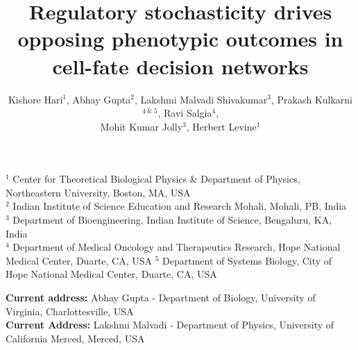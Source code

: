 \documentclass[11pt]{article}
\title{Regulatory stochasticity drives opposing phenotypic outcomes in cell-fate decision networks}
\author{Kishore Hari$^1$, Abhay Gupta$^2$, Lakshmi Malvadi Shivakumar$^3$, Prakash Kulkarni$^{4~\&~5}$, Ravi Salgia$^4$, \\ Mohit Kumar Jolly$^3$, Herbert Levine$^1$}
\providecommand{\DIFaddtex}[1]{{\protect\color{blue}\uwave{#1}}} %
\providecommand{\DIFaddbegin}{} %
\providecommand{\DIFaddend}{} %
\providecommand{\DIFadd}[1]{\texorpdfstring{\DIFaddtex{#1}}{#1}} %
\providecommand{\DIFaddincludegraphics}[2][]{{\color{blue}\fbox{\DIFOincludegraphics[#1]{#2}}}} %
\DeclareRobustCommand{\DIFaddbegin}{\DIFOaddbegin \let\includegraphics\DIFaddincludegraphics} %
\DeclareRobustCommand{\DIFaddend}{\DIFOaddend \let\includegraphics\DIFOincludegraphics} %
\begin{document}
\maketitle
\begin{center}
    $^1$ Center for Theoretical Biological Physics \& Department of Physics, Northeastern University, Boston, MA, USA\\
    $^2$ Indian Institute of Science Education and Research Mohali, Mohali, PB, India\\
    $^3$ Department of Bioengineering, Indian Institute of Science, Bengaluru, KA, India \\
    $^4$ Department of Medical Oncology and Therapeutics Research, \DIFaddbegin \DIFadd{City of }\DIFaddend Hope National Medical Center, Duarte, CA, USA
    $^5$ Department of Systems Biology, City of Hope National Medical Center, Duarte, CA, USA 
\end{center}
\begin{center}
    \small \textbf{Current address:} Abhay Gupta - Department of Biology, University of Virginia, Charlottesville, USA\\
    \small \textbf{Current Address:} Lakshmi Malvadi - Department of Physics, University of California Merced, Merced, USA\\
\end{center}
\end{document}
